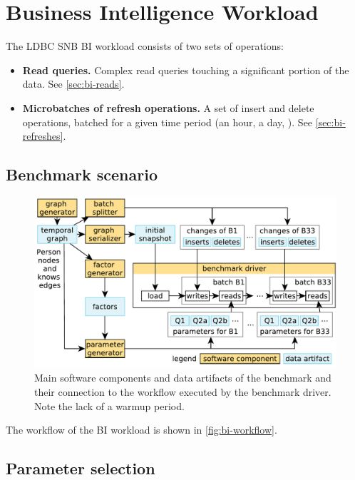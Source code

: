 \chapter{Business Intelligence Workload}
\label{sec:bi}

The LDBC SNB BI workload consists of two sets of operations:

\begin{itemize}
\item \textbf{Read queries.} Complex read queries touching a significant portion of the data. See \autoref{sec:bi-reads}.
\item \textbf{Microbatches of refresh operations.} A set of insert and delete operations, batched for a given time period (\eg an hour, a day, \etc). See \autoref{sec:bi-refreshes}.
\end{itemize}

\section{Benchmark scenario}
\label{sec:bi-benchmark-scenario}

\begin{figure}[H]
    \centering
    \includegraphics[scale=\yedscale]{figures/bi-workflow}
    \caption{Main software components and data artifacts of the benchmark and their connection to the workflow executed by the benchmark driver. Note the lack of a warmup period.}
    \label{fig:bi-workflow}
\end{figure}

The workflow of the BI workload is shown in \autoref{fig:bi-workflow}.

\section{Parameter selection}
\label{sec:bi-paramgen}

